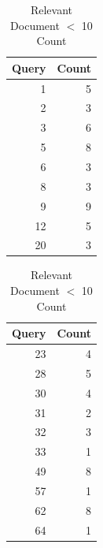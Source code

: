 \documentclass[11pt]{article}
\begin{document}
\begin{table}[ht]
\caption{Relevant Document $<$ 10 Count }
\begin{minipage}{.5\linewidth}
\centering
       \begin{tabular}{rr}
  \hline
 Query & Count \\ 
  \hline
 1 &   5 \\ 
2 &   3 \\ 
  3 &   6 \\ 
  5 &   8 \\ 
   6 &   3 \\ 
   8 &   3 \\ 
  9 &   9 \\ 
  12 &   5 \\ 
20 &   3 \\ 
   \hline
\end{tabular}
    \end{minipage}%
    \centering
    \begin{minipage}{.5\linewidth}
       \begin{tabular}{rr}
  \hline
 Query & Count \\ 
  \hline
23 &   4 \\ 
  28 &   5 \\ 
   30 &   4 \\ 
31 &   2 \\ 
  32 &   3 \\ 
  33 &   1 \\ 
  49 &   8 \\ 
  57 &   1 \\ 
   62 &   8 \\ 
  64 &   1 \\ 
   \hline
\end{tabular}
    \end{minipage} 
\label{tbl:lt10}
\end{table}
\end{document}
